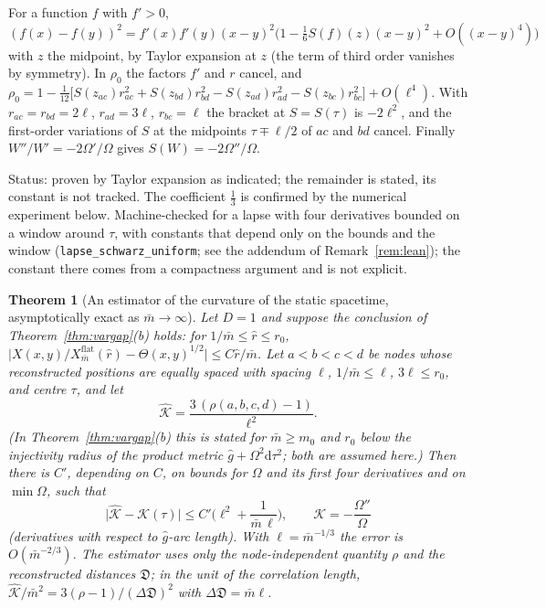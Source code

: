 \documentclass[11pt,a4paper]{article}
\makeatletter
\theoremstyle{stmt}
\newtheorem{theorem}{Theorem}[section]
\theoremstyle{defn}
\theoremstyle{rmk}
\renewenvironment{proof}[1][\proofname]{\par\pushQED{\qed}\normalfont\topsep6\p@\@plus6\p@\relax
  \trivlist\item[\hskip\labelsep{\sffamily\itshape\small #1.}]\ignorespaces}{\popQED\endtrivlist\@endpefalse}
\numberwithin{equation}{section}
\newcommand{\status}[1]{\par\noindent\textsf{\small Status: #1}\par}
\newcommand{\dd}{\mathrm{d}}
\makeatother
\begin{document}
{\begin{proof}
For a function $f$ with $f'>0$, $(f(x)-f(y))^2=f'(x)f'(y)(x-y)^2\big(1-\tfrac16S(f)(z)(x-y)^2+O((x-y)^4)\big)$ with $z$ the midpoint, by Taylor expansion at $z$ (the term of third order vanishes by symmetry). In $\rho_0$ the factors $f'$ and $r$ cancel, and
$\rho_0=1-\tfrac1{12}\big[S(z_{ac})r_{ac}^2+S(z_{bd})r_{bd}^2-S(z_{ad})r_{ad}^2-S(z_{bc})r_{bc}^2\big]+O(\ell^4)$. With $r_{ac}=r_{bd}=2\ell$, $r_{ad}=3\ell$, $r_{bc}=\ell$ the bracket at $S=S(\tau)$ is $-2\ell^2$, and the first-order variations of $S$ at the midpoints $\tau\mp\ell/2$ of $ac$ and $bd$ cancel. Finally $W''/W'=-2\Omega'/\Omega$ gives $S(W)=-2\Omega''/\Omega$.
\end{proof}
\status{proven by Taylor expansion as indicated; the remainder is stated, its constant is not tracked. The coefficient $\tfrac13$ is confirmed by the numerical experiment below. Machine-checked for a lapse with four derivatives bounded on a window around $\tau$, with constants that depend only on the bounds and the window (\texttt{lapse\_schwarz\_uniform}; see the addendum of Remark~\ref{rem:lean}); the constant there comes from a compactness argument and is not explicit.}

\begin{theorem}[An estimator of the curvature of the static spacetime, asymptotically exact as $\bar m\to\infty$]\label{thm:lapse-est}
Let $D=1$ and suppose the conclusion of Theorem~\ref{thm:vargap}(b) holds: for $1/\bar m\le\hat r\le r_0$, $\big|X(x,y)/X^{\mathrm{flat}}_{\bar m}(\hat r)-\Theta(x,y)^{1/2}\big|\le C\hat r/\bar m$. Let $a<b<c<d$ be nodes whose reconstructed positions are equally spaced with spacing $\ell$, $1/\bar m\le\ell$, $3\ell\le r_0$, and centre $\tau$, and let
\[
\hat{\mathcal K}=\frac{3\,(\rho(a,b,c,d)-1)}{\ell^2} .
\]
(In Theorem~\ref{thm:vargap}(b) this is stated for $\bar m\ge m_0$ and $r_0$ below the injectivity radius of the product metric $\hat g+\Omega^2\dd\tau^2$; both are assumed here.) Then there is $C'$, depending on $C$, on bounds for $\Omega$ and its first four derivatives and on $\min\Omega$, such that
\[
\big|\hat{\mathcal K}-\mathcal K(\tau)\big|\le C'\Big(\ell^2+\frac1{\bar m\,\ell}\Big),\qquad\mathcal K=-\frac{\Omega''}{\Omega}
\]
(derivatives with respect to $\hat g$-arc length). With $\ell=\bar m^{-1/3}$ the error is $O(\bar m^{-2/3})$. The estimator uses only the node-independent quantity $\rho$ and the reconstructed distances $\mathfrak D$; in the unit of the correlation length, $\hat{\mathcal K}/\bar m^2=3(\rho-1)/(\Delta\mathfrak D)^2$ with $\Delta\mathfrak D=\bar m\ell$.
\end{theorem}

}
\end{document}
